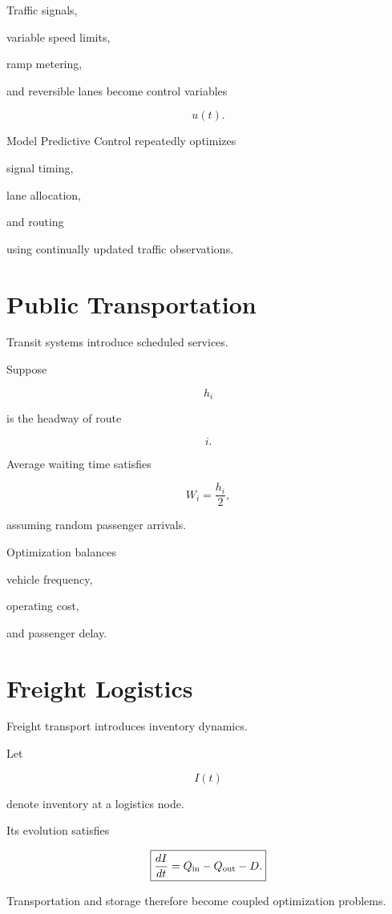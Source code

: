 \documentclass[11pt,fleqn]{book}
\numberwithin{equation}{chapter}
\theoremstyle{plain}
\theoremstyle{definition}
\theoremstyle{remark}
\begin{document}
Traffic signals,

variable speed limits,

ramp metering,

and reversible lanes become control variables

\[
u(t).
\]

Model Predictive Control repeatedly optimizes

signal timing,

lane allocation,

and routing

using continually updated traffic observations.


\section{Public Transportation}

Transit systems introduce scheduled services.

Suppose

\[
h_i
\]

is the headway of route

\[
i.
\]

Average waiting time satisfies

\[
W_i
=
\frac{h_i}{2},
\]

assuming random passenger arrivals.

Optimization balances

vehicle frequency,

operating cost,

and passenger delay.


\section{Freight Logistics}

Freight transport introduces inventory dynamics.

Let

\[
I(t)
\]

denote inventory at a logistics node.

Its evolution satisfies

\[
\boxed{
\frac{dI}{dt}
=
Q_{\rm in}
-
Q_{\rm out}
-
D.
}
\]

Transportation and storage therefore become coupled optimization
problems.
\end{document}
